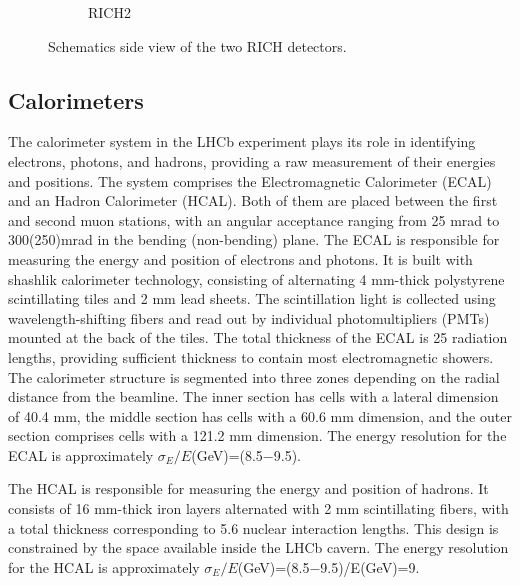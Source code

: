 \begin{figure}
\begin{subfigure}{0.48\textwidth}
    \caption{RICH2}\label{rich2}
    \end{subfigure}
    \caption{Schematics side view of the two RICH detectors.}
    \label{fig:rich}
\end{figure}

\subsection{Calorimeters}
The calorimeter system in the LHCb experiment\cite{LHCb:2000vji} plays its role in identifying electrons, photons, and hadrons, providing a raw measurement of their energies and positions. The system comprises the Electromagnetic Calorimeter (ECAL) and an  Hadron Calorimeter (HCAL). Both of them are  placed between the first and second muon stations, with an angular acceptance ranging from 25 mrad to 300(250)mrad in the bending (non-bending) plane. 
The ECAL is responsible for measuring the energy and position of electrons and photons. It is built with shashlik calorimeter technology, consisting of alternating 4 mm-thick polystyrene scintillating tiles and 2 mm lead sheets. The scintillation light is collected using wavelength-shifting fibers and read out by individual photomultipliers (PMTs) mounted at the back of the tiles. The total thickness of the ECAL is 25 radiation lengths, providing sufficient thickness to contain most electromagnetic showers. The calorimeter structure is segmented into three zones depending on the radial distance from the beamline. The inner section has cells with a lateral dimension of 40.4 mm, the middle section has cells with a 60.6 mm dimension, and the outer section comprises cells with a 121.2 mm dimension. The energy resolution for the ECAL is approximately 
 $\sigma_E/E$(GeV)=(8.5−9.5).

The HCAL is responsible for measuring the energy and position of hadrons. It consists of 16 mm-thick iron layers alternated with 2 mm scintillating fibers, with a total thickness corresponding to 5.6 nuclear interaction lengths. This design is constrained by the space available inside the LHCb cavern. The energy resolution for the HCAL is approximately $\sigma_E/E$(GeV)=(8.5−9.5)/E(GeV)=9. 

